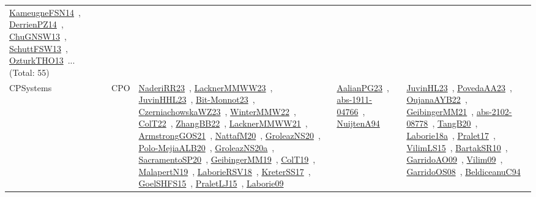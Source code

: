 {\begin{longtable}{lp{3cm}>{\raggedright\arraybackslash}p{6cm}>{\raggedright\arraybackslash}p{6cm}>{\raggedright\arraybackslash}p{8cm}}
\href{works/KameugneFSN14.pdf}{KameugneFSN14}~\cite{KameugneFSN14}, \href{works/DerrienPZ14.pdf}{DerrienPZ14}~\cite{DerrienPZ14}, \href{works/ChuGNSW13.pdf}{ChuGNSW13}~\cite{ChuGNSW13}, \href{works/SchuttFSW13.pdf}{SchuttFSW13}~\cite{SchuttFSW13}, \href{works/OzturkTHO13.pdf}{OzturkTHO13}~\cite{OzturkTHO13}... (Total: 55)\\
CPSystems & CPO & \href{works/NaderiRR23.pdf}{NaderiRR23}~\cite{NaderiRR23}, \href{works/LacknerMMWW23.pdf}{LacknerMMWW23}~\cite{LacknerMMWW23}, \href{works/JuvinHHL23.pdf}{JuvinHHL23}~\cite{JuvinHHL23}, \href{works/Bit-Monnot23.pdf}{Bit-Monnot23}~\cite{Bit-Monnot23}, \href{works/CzerniachowskaWZ23.pdf}{CzerniachowskaWZ23}~\cite{CzerniachowskaWZ23}, \href{works/WinterMMW22.pdf}{WinterMMW22}~\cite{WinterMMW22}, \href{works/ColT22.pdf}{ColT22}~\cite{ColT22}, \href{works/ZhangBB22.pdf}{ZhangBB22}~\cite{ZhangBB22}, \href{works/LacknerMMWW21.pdf}{LacknerMMWW21}~\cite{LacknerMMWW21}, \href{works/ArmstrongGOS21.pdf}{ArmstrongGOS21}~\cite{ArmstrongGOS21}, \href{works/NattafM20.pdf}{NattafM20}~\cite{NattafM20}, \href{works/GroleazNS20.pdf}{GroleazNS20}~\cite{GroleazNS20}, \href{works/Polo-MejiaALB20.pdf}{Polo-MejiaALB20}~\cite{Polo-MejiaALB20}, \href{works/GroleazNS20a.pdf}{GroleazNS20a}~\cite{GroleazNS20a}, \href{works/SacramentoSP20.pdf}{SacramentoSP20}~\cite{SacramentoSP20}, \href{works/GeibingerMM19.pdf}{GeibingerMM19}~\cite{GeibingerMM19}, \href{works/ColT19.pdf}{ColT19}~\cite{ColT19}, \href{works/MalapertN19.pdf}{MalapertN19}~\cite{MalapertN19}, \href{works/LaborieRSV18.pdf}{LaborieRSV18}~\cite{LaborieRSV18}, \href{works/KreterSS17.pdf}{KreterSS17}~\cite{KreterSS17}, \href{works/GoelSHFS15.pdf}{GoelSHFS15}~\cite{GoelSHFS15}, \href{works/PraletLJ15.pdf}{PraletLJ15}~\cite{PraletLJ15}, \href{works/Laborie09.pdf}{Laborie09}~\cite{Laborie09} & \href{works/AalianPG23.pdf}{AalianPG23}~\cite{AalianPG23}, \href{works/abs-1911-04766.pdf}{abs-1911-04766}~\cite{abs-1911-04766}, \href{works/NuijtenA94.pdf}{NuijtenA94}~\cite{NuijtenA94} & \href{works/JuvinHL23.pdf}{JuvinHL23}~\cite{JuvinHL23}, \href{works/PovedaAA23.pdf}{PovedaAA23}~\cite{PovedaAA23}, \href{works/OujanaAYB22.pdf}{OujanaAYB22}~\cite{OujanaAYB22}, \href{works/GeibingerMM21.pdf}{GeibingerMM21}~\cite{GeibingerMM21}, \href{works/abs-2102-08778.pdf}{abs-2102-08778}~\cite{abs-2102-08778}, \href{works/TangB20.pdf}{TangB20}~\cite{TangB20}, \href{works/Laborie18a.pdf}{Laborie18a}~\cite{Laborie18a}, \href{works/Pralet17.pdf}{Pralet17}~\cite{Pralet17}, \href{works/VilimLS15.pdf}{VilimLS15}~\cite{VilimLS15}, \href{works/BartakSR10.pdf}{BartakSR10}~\cite{BartakSR10}, \href{works/GarridoAO09.pdf}{GarridoAO09}~\cite{GarridoAO09}, \href{works/Vilim09.pdf}{Vilim09}~\cite{Vilim09}, \href{works/GarridoOS08.pdf}{GarridoOS08}~\cite{GarridoOS08}, \href{works/BeldiceanuC94.pdf}{BeldiceanuC94}~\cite{BeldiceanuC94}\\

\end{longtable}}
